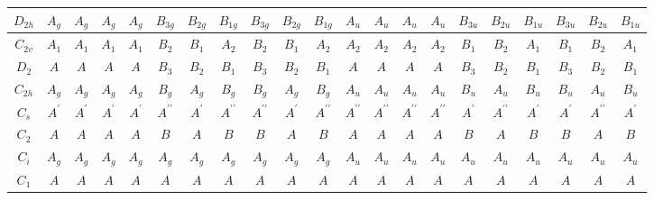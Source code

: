 \documentclass[11pt]{easymemo}
\begin{document}
\begin{landscape}
\begin{table}[ht!]
\begin{center}
\begin{tabular}{c||c|c|cc|ccc|ccc||c|c|cc|ccc|ccc}
$ D_{2h} $ & $ A_{g} $ & $ A_{g} $ & $ A_{g} $ & $ A_{g} $ & $ B_{3g} $ & $ B_{2g} $ & $ B_{1g} $ & $ B_{3g} $ & $ B_{2g} $ & $ B_{1g} $ & $ A_{u} $ & $ A_{u} $ & $ A_{u} $ & $ A_{u} $ & $ B_{3u} $ & $ B_{2u} $ & $ B_{1u} $ & $ B_{3u} $ & $ B_{2u} $ & $ B_{1u} $ \\ \hline
$ C_{2v} $ & $ A_{1} $ & $ A_{1} $ & $ A_{1} $ & $ A_{1} $ & $ B_{2} $ & $ B_{1} $ & $ A_{2} $ & $ B_{2} $ & $ B_{1} $ & $ A_{2} $ & $ A_{2} $ & $ A_{2} $ & $ A_{2} $ & $ A_{2} $ & $ B_{1} $ & $ B_{2} $ & $ A_{1} $ & $ B_{1} $ & $ B_{2} $ & $ A_{1} $ \\ \hline
$ D_{2} $ & $ A $ & $ A $ & $ A $ & $ A $ & $ B_{3} $ & $ B_{2} $ & $ B_{1} $ & $ B_{3} $ & $ B_{2} $ & $ B_{1} $ & $ A $ & $ A $ & $ A $ & $ A $ & $ B_{3} $ & $ B_{2} $ & $ B_{1} $ & $ B_{3} $ & $ B_{2} $ & $ B_{1} $ \\ \hline\hline
$ C_{2h} $ & $ A_{g} $ & $ A_{g} $ & $ A_{g} $ & $ A_{g} $ & $ B_{g} $ & $ A_{g} $ & $ B_{g} $ & $ B_{g} $ & $ A_{g} $ & $ B_{g} $ & $ A_{u} $ & $ A_{u} $ & $ A_{u} $ & $ A_{u} $ & $ B_{u} $ & $ A_{u} $ & $ B_{u} $ & $ B_{u} $ & $ A_{u} $ & $ B_{u} $ \\ \hline
$ C_{s} $ & $ A^{\prime} $ & $ A^{\prime} $ & $ A^{\prime} $ & $ A^{\prime} $ & $ A^{\prime\prime} $ & $ A^{\prime} $ & $ A^{\prime\prime} $ & $ A^{\prime\prime} $ & $ A^{\prime} $ & $ A^{\prime\prime} $ & $ A^{\prime\prime} $ & $ A^{\prime\prime} $ & $ A^{\prime\prime} $ & $ A^{\prime\prime} $ & $ A^{\prime} $ & $ A^{\prime\prime} $ & $ A^{\prime} $ & $ A^{\prime} $ & $ A^{\prime\prime} $ & $ A^{\prime} $ \\ \hline
$ C_{2} $ & $ A $ & $ A $ & $ A $ & $ A $ & $ B $ & $ A $ & $ B $ & $ B $ & $ A $ & $ B $ & $ A $ & $ A $ & $ A $ & $ A $ & $ B $ & $ A $ & $ B $ & $ B $ & $ A $ & $ B $ \\ \hline\hline
$ C_{i} $ & $ A_{g} $ & $ A_{g} $ & $ A_{g} $ & $ A_{g} $ & $ A_{g} $ & $ A_{g} $ & $ A_{g} $ & $ A_{g} $ & $ A_{g} $ & $ A_{g} $ & $ A_{u} $ & $ A_{u} $ & $ A_{u} $ & $ A_{u} $ & $ A_{u} $ & $ A_{u} $ & $ A_{u} $ & $ A_{u} $ & $ A_{u} $ & $ A_{u} $ \\ \hline
$ C_{1} $ & $ A $ & $ A $ & $ A $ & $ A $ & $ A $ & $ A $ & $ A $ & $ A $ & $ A $ & $ A $ & $ A $ & $ A $ & $ A $ & $ A $ & $ A $ & $ A $ & $ A $ & $ A $ & $ A $ & $ A $ \\ \hline\hline
\end{tabular}
\end{center}
\end{table}
\end{landscape}
\end{document}
